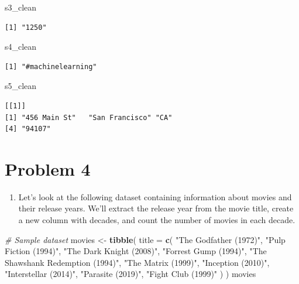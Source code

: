 \documentclass[
]{book}
\newenvironment{Shaded}{\begin{snugshade}}{\end{snugshade}}
\newcommand{\AttributeTok}[1]{\textcolor[rgb]{0.13,0.29,0.53}{#1}}
\newcommand{\CommentTok}[1]{\textcolor[rgb]{0.56,0.35,0.01}{\textit{#1}}}
\newcommand{\FunctionTok}[1]{\textcolor[rgb]{0.13,0.29,0.53}{\textbf{#1}}}
\newcommand{\NormalTok}[1]{#1}
\newcommand{\OtherTok}[1]{\textcolor[rgb]{0.56,0.35,0.01}{#1}}
\newcommand{\StringTok}[1]{\textcolor[rgb]{0.31,0.60,0.02}{#1}}
\providecommand{\tightlist}{%
  \setlength{\itemsep}{0pt}\setlength{\parskip}{0pt}}
\begin{document}
\begin{Shaded}
\begin{Highlighting}[]
\NormalTok{s3\_clean}
\end{Highlighting}
\end{Shaded}

\begin{verbatim}
[1] "1250"
\end{verbatim}

\begin{Shaded}
\begin{Highlighting}[]
\NormalTok{s4\_clean}
\end{Highlighting}
\end{Shaded}

\begin{verbatim}
[1] "#machinelearning"
\end{verbatim}

\begin{Shaded}
\begin{Highlighting}[]
\NormalTok{s5\_clean}
\end{Highlighting}
\end{Shaded}

\begin{verbatim}
[[1]]
[1] "456 Main St"   "San Francisco" "CA"           
[4] "94107"        
\end{verbatim}

\hypertarget{problem-4}{%
\section{Problem 4}\label{problem-4}}

\begin{enumerate}
\def\labelenumi{\alph{enumi}.}
\tightlist
\item
  Let's look at the following dataset containing information about movies and their release years. We'll extract the release year from the movie title, create a new column with decades, and count the number of movies in each decade.
\end{enumerate}

\begin{Shaded}
\begin{Highlighting}[]
\CommentTok{\# Sample dataset}
\NormalTok{movies }\OtherTok{\textless{}{-}} \FunctionTok{tibble}\NormalTok{(}
  \AttributeTok{title =} \FunctionTok{c}\NormalTok{(}
    \StringTok{"The Godfather (1972)"}\NormalTok{, }\StringTok{"Pulp Fiction (1994)"}\NormalTok{, }\StringTok{"The Dark Knight (2008)"}\NormalTok{,}
    \StringTok{"Forrest Gump (1994)"}\NormalTok{, }\StringTok{"The Shawshank Redemption (1994)"}\NormalTok{, }\StringTok{"The Matrix (1999)"}\NormalTok{,}
    \StringTok{"Inception (2010)"}\NormalTok{, }\StringTok{"Interstellar (2014)"}\NormalTok{, }\StringTok{"Parasite (2019)"}\NormalTok{, }\StringTok{"Fight Club (1999)"}
\NormalTok{  )}
\NormalTok{)}
\NormalTok{movies}
\end{Highlighting}
\end{Shaded}
\end{document}
